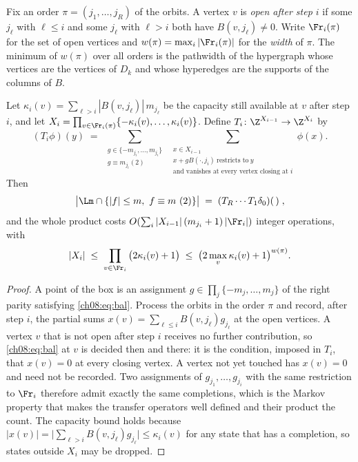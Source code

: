 \begin{definition}[frontier]\label{ch08:def:front}
Fix an order $\pi=(j_1,\dots,j_R)$ of the orbits. A vertex $v$ is \emph{open after step $i$}
if some $j_\ell$ with $\ell\le i$ and some $j_\ell$ with $\ell>i$ both have $B(v,j_\ell)\ne0$.
Write $\Fr_i(\pi)$ for the set of open vertices and $w(\pi)=\max_i|\Fr_i(\pi)|$ for the
\emph{width} of $\pi$. The minimum of $w(\pi)$ over all orders is the pathwidth of the
hypergraph whose vertices are the vertices of $D_k$ and whose hyperedges are the supports of
the columns of $B$.
\end{definition}

\begin{theorem}\label{ch08:thm:elim}
Let $\kappa_i(v)=\sum_{\ell>i}|B(v,j_\ell)|\,m_{j_\ell}$ be the capacity still available at
$v$ after step $i$, and let
$X_i=\prod_{v\in\Fr_i(\pi)}\{-\kappa_i(v),\dots,\kappa_i(v)\}$.
Define $T_i\colon \Z^{X_{i-1}}\to\Z^{X_i}$ by
\[
(T_i\phi)(y)\;=\;\sum_{\substack{g\in\{-m_{j_i},\dots,m_{j_i}\}\\ g\equiv m_{j_i}(2)}}
\ \sum_{\substack{x\in X_{i-1}\\ x+gB(\cdot,j_i)\ \text{restricts to}\ y\\
\text{and vanishes at every vertex closing at }i}}\phi(x).
\]
Then
\[
\big|\Lm\cap\{|f|\le m,\ f\equiv m\ (2)\}\big|\;=\;(T_R\cdots T_1\delta_0)(\,)\;,
\]
and the whole product costs $O\!\left(\sum_i |X_{i-1}|\,(m_{j_i}+1)\,|\Fr_i|\right)$ integer
operations, with
\[
|X_i|\;\le\;\prod_{v\in\Fr_i}\big(2\kappa_i(v)+1\big)
\;\le\;\big(2\max_v\kappa_i(v)+1\big)^{w(\pi)} .
\]
\end{theorem}

\begin{proof}
A point of the box is an assignment $g\in\prod_j\{-m_j,\dots,m_j\}$ of the right parity
satisfying \eqref{ch08:eq:bal}. Process the orbits in the order $\pi$ and record, after step $i$,
the partial sums $x(v)=\sum_{\ell\le i}B(v,j_\ell)g_{j_\ell}$ at the open vertices. A vertex
$v$ that is not open after step $i$ receives no further contribution, so \eqref{ch08:eq:bal} at $v$
is decided then and there: it is the condition, imposed in $T_i$, that $x(v)=0$ at every
closing vertex. A vertex not yet touched has $x(v)=0$ and need not be recorded. Two
assignments of $g_{j_1},\dots,g_{j_i}$ with the same restriction to $\Fr_i$ therefore admit
exactly the same completions, which is the Markov property that makes the transfer operators
well defined and their product the count. The capacity bound holds because
$|x(v)|=\big|\sum_{\ell>i}B(v,j_\ell)g_{j_\ell}\big|\le\kappa_i(v)$ for any state that has a
completion, so states outside $X_i$ may be dropped.
\end{proof}

